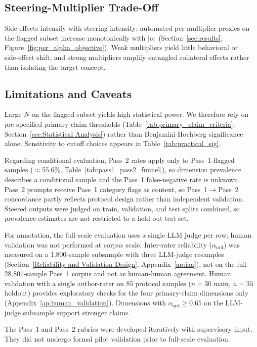 \subsection{Steering-Multiplier Trade-Off}
Side effects intensify with steering intensity: automated per-multiplier proxies on the flagged subset increase monotonically with $|\alpha|$ (Section~\ref{sec:results}, Figure~\ref{fig:per_alpha_objective}).
Weak multipliers yield little behavioral or side-effect shift, and strong multipliers amplify entangled collateral effects rather than isolating the target concept.

\subsection{Limitations and Caveats}\label{sec:limitations}
Large $N$ on the flagged subset yields high statistical power.
We therefore rely on pre-specified primary-claim thresholds (Table~\ref{tab:primary_claim_criteria}, Section~\ref{sec:Statistical Analysis}) rather than Benjamini-Hochberg significance alone.
Sensitivity to cutoff choices appears in Table~\ref{tab:practical_sig}.

Regarding conditional evaluation, Pass~2 rates apply only to Pass~1-flagged samples ($\approx$55.6\%, Table~\ref{tab:pass1_pass2_funnel}), so dimension prevalence describes a conditional sample and the Pass~1 false-negative rate is unknown.
Pass~2 prompts receive Pass~1 category flags as context, so Pass~1$\to$Pass~2 concordance partly reflects protocol design rather than independent validation.
Steered outputs were judged on train, validation, and test splits combined, so prevalence estimates are not restricted to a held-out test set.

For annotation, the full-scale evaluation uses a single LLM judge per row; human validation was not performed at corpus scale.
Inter-rater reliability ($\alpha_{\mathrm{ord}}$) was measured on a 1,800-sample subsample with three LLM-judge resamples (Section~\ref{Reliability and Validation Design}, Appendix~\ref{ap:iaa}), not on the full 28{,}807-sample Pass~1 corpus and not as human-human agreement.
Human validation with a single author-rater on 85 protocol samples ($n{=}30$ main, $n{=}35$ holdout) provides exploratory checks for the four primary-claim dimensions only (Appendix~\ref{ap:human_validation}).
Dimensions with $\alpha_{\mathrm{ord}} \ge 0.65$ on the LLM-judge subsample support stronger claims.

The Pass~1 and Pass~2 rubrics were developed iteratively with supervisory input. They did not undergo formal pilot validation prior to full-scale evaluation.

